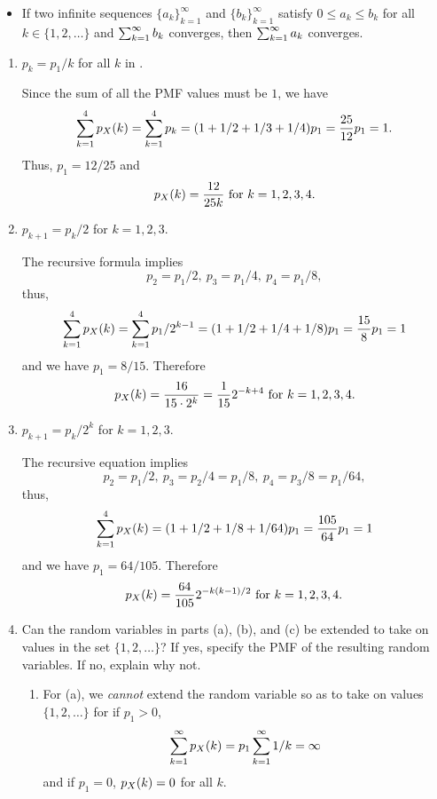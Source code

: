 \begin{enumerate}
\begin{itemize}
		\item If two infinite sequences
		$\{a_k\}_{k=1}^\infty$
		and $\{b_k\}_{k=1}^\infty$
		satisfy $0\leq a_k\leq b_k$ for all $k\in\{1,2,\ldots\}$
		and $\sum_{k=1}^{\infty} b_k$ converges,
		then $\sum_{k=1}^{\infty} a_k$ converges.
	\end{itemize}
	\begin{enumerate}
		\item $p_k = p_1/k$ for all $k$ in \ssx.
		\ifdefined\sol
		\begin{solution}
		Since the sum of all the PMF values must be $1$,
		we have
		\[
			\sum_{k=1}^{4} p_{X}(k)
			= \sum_{k=1}^{4} p_k
			= (1 + 1/2 + 1/3 + 1/4) p_1
			= \frac{25}{12} p_1 = 1.
		\]
		Thus, $p_1 = 12/25$ and
		\[
			p_{X}(k) = \frac{12}{25k} \mbox{ for } k=1,2,3,4.
		\]
		\end{solution}
		\fi

		\item $p_{k+1} = p_k/2$ for $k = 1, 2, 3$.
		\ifdefined\sol
		\begin{solution}
		The recursive formula implies
		\[
			p_2 = p_1 /2,\
			p_3 = p_1 /4,\
			p_4 = p_1 /8,
		\]
		thus,
		\[
			\sum_{k=1}^{4} p_{X}(k)
			= \sum_{k=1}^{4} p_1 / 2^{k-1}
			= (1+1/2+1/4+1/8) p_1
			= \frac{15}{8} p_1 = 1
		\]
		and we have $p_1 = 8/15$.
		Therefore
		\[
			p_{X}(k) = \frac{16}{15\cdot 2^k}
			= \frac{1}{15} 2^{-k+4}
			\mbox{ for } k=1,2,3,4.
		\]
		\end{solution}
		\fi

		\item $p_{k+1} = p_k/2^k$ for $k = 1, 2, 3$.
		\ifdefined\sol
		\begin{solution}
		The recursive equation implies
		\[
			p_2 = p_1 /2,\
			p_3 = p_2 /4 = p_1/8,\
			p_4 = p_3 /8 = p_1/64,
		\]
		thus,
		\[
			\sum_{k=1}^{4} p_{X}(k)
			= (1+1/2+1/8+1/64) p_1
			= \frac{105}{64} p_1 = 1
		\]
		and we have $p_1 = 64/105$.
		Therefore
		\[
			p_{X}(k) = \frac{64}{105} 2^{-k(k-1)/2}
			\mbox{ for } k=1,2,3,4.
		\]
		\end{solution}
		\fi


		\item Can the random variables in parts (a), (b), and (c)
		be extended to take on values in the set $\{1, 2, \ldots\}$?
		If yes, specify the PMF of the resulting random variables.
		If no, explain why not.
		\ifdefined\sol
		\begin{solution}
			\begin{enumerate}
			\item
				For (a), we \emph{cannot}
				extend the random variable so as to take
				on values $\{1,2,\ldots\}$
				for if $p_1>0$,
				\[
					\sum_{k=1}^{\infty} p_{X}(k) = p_1 \sum_{k=1}^{\infty} 1/k = \infty
				\]
				and if $p_1=0$, $p_{X}(k) = 0 $ for all $k$.


\end{enumerate}
\end{solution}
\end{enumerate}
\end{enumerate}

